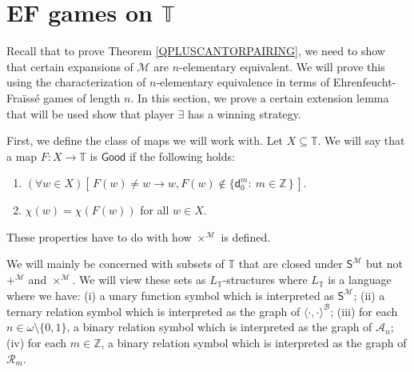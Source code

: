 \documentclass[10pt,a4paper, openany,  oldfontcommands]{memoir}
\newtheorem{open problem} [theorem] {Open Problem}
\newtheorem{open question} [theorem] {Open Question}
\renewcommand{\mathrm}{\mathsf}
\begin{document}
\section{EF  games on $  \mathbb{T} $}








 Recall that to prove  Theorem  \ref{QPLUSCANTORPAIRING},   we need to show    that    certain expansions  of  $  \mathcal{M}    $  are  $n$-elementary equivalent. 
 We will prove this   using the characterization of  $n$-elementary equivalence in terms of   Ehrenfeucht-Fra\"iss\'e games of length  $n$. 
In this section,  
we  prove a certain extension lemma that will be used show that player  $  \exists  $  has a winning strategy. 





First,  we define the class of maps we will work with. 
Let  $  X  \subseteq   \mathbb{T} $. 
We will say that a map    $  F :     X  \to   \mathbb{T}   $   is  $  \mathsf{Good}   $ if the following holds: 
\begin{enumerate}
\item  $  \left(   \forall   w  \in X  \right)   \left[  \,   F(w)  \neq  w   \rightarrow   w,  F(w)  \not\in   \lbrace  \mathsf{d}^m_0  :   \   m  \in  \mathbb{Z}  \,    \rbrace    \,    \right]   $.
\item  $  \chi \left(  w  \right)   =     \chi \left( F( w ) \right)   $  for all   $  w  \in  X   $.
\end{enumerate}
These properties have to do with how  $  \times^{  \mathcal{M}  }  $  is defined. 







We will mainly be concerned with subsets of   $  \mathbb{T} $ that are closed under  $  \mathrm{S}^{ \mathcal{M} }  $  but not  $  +^{  \mathcal{M} }  $  and  $  \times^{  \mathcal{M} }  $. 
We will view these sets as   $ L_{  \mathbb{T} } $-structures where    $  L_{  \mathbb{T} } $    is  a  language where we have: 
(i)  a unary  function   symbol which is interpreted  as    $ \mathrm{S}^{  \mathcal{M} }    $; 
(ii) a ternary relation symbol which is interpreted as the graph of   $  \langle  \cdot  ,  \cdot  \rangle^{  \mathcal{B}  }  $; 
(iii) for each  $  n  \in  \omega \setminus  \lbrace 0, 1  \rbrace $,  a binary relation  symbol  which is interpreted  as    the graph of $  \mathcal{A}_n $; 
(iv) for each  $m  \in  \mathbb{Z} $,  a binary relation  symbol  which is interpreted  as    the graph of $  \mathcal{R}_m $.
\end{document}
